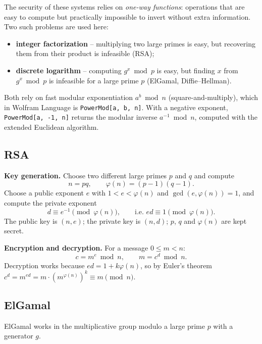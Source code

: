 \documentclass[12pt,a4paper]{article}
\begin{document}
The security of these systems relies on \emph{one-way functions}: operations that are easy to compute but practically impossible to invert without extra information. Two such problems are used here:
\begin{itemize}
  \item \textbf{integer factorization} -- multiplying two large primes is easy, but recovering them from their product is infeasible (RSA);
  \item \textbf{discrete logarithm} -- computing $g^x \bmod p$ is easy, but finding $x$ from $g^x \bmod p$ is infeasible for a large prime $p$ (ElGamal, Diffie--Hellman).
\end{itemize}

Both rely on fast modular exponentiation $a^b \bmod n$ (square-and-multiply), which in Wolfram Language is \texttt{PowerMod[a, b, n]}. With a negative exponent, \texttt{PowerMod[a, -1, n]} returns the modular inverse $a^{-1} \bmod n$, computed with the extended Euclidean algorithm.

\subsection{RSA}

\textbf{Key generation.} Choose two different large primes $p$ and $q$ and compute
\begin{equation}
  n = pq, \qquad \varphi(n) = (p-1)(q-1).
\end{equation}
Choose a public exponent $e$ with $1 < e < \varphi(n)$ and $\gcd(e, \varphi(n)) = 1$, and compute the private exponent
\begin{equation}
  d \equiv e^{-1} \pmod{\varphi(n)}, \qquad \text{i.e. } ed \equiv 1 \pmod{\varphi(n)}.
\end{equation}
The public key is $(n, e)$; the private key is $(n, d)$; $p$, $q$ and $\varphi(n)$ are kept secret.

\textbf{Encryption and decryption.} For a message $0 \le m < n$:
\begin{equation}
  c = m^e \bmod n, \qquad m = c^d \bmod n.
\end{equation}
Decryption works because $ed = 1 + k\varphi(n)$, so by Euler's theorem $c^d = m^{ed} = m \cdot (m^{\varphi(n)})^k \equiv m \pmod n$.

\subsection{ElGamal}

ElGamal works in the multiplicative group modulo a large prime $p$ with a generator $g$.
\end{document}
